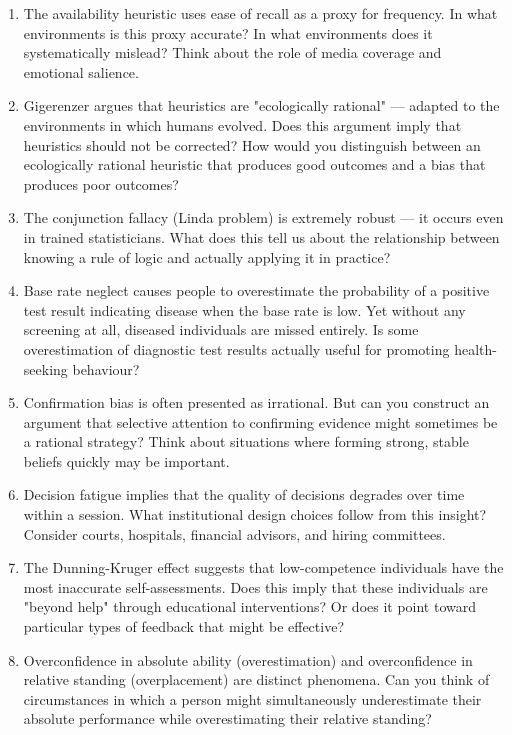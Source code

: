 \documentclass[12pt, letterpaper]{article}
\begin{document}
\begin{enumerate}
\item The availability heuristic uses ease of recall as a proxy for frequency. In what environments is this proxy accurate? In what environments does it systematically mislead? Think about the role of media coverage and emotional salience.

\item Gigerenzer argues that heuristics are "ecologically rational" --- adapted to the environments in which humans evolved. Does this argument imply that heuristics should not be corrected? How would you distinguish between an ecologically rational heuristic that produces good outcomes and a bias that produces poor outcomes?

\item The conjunction fallacy (Linda problem) is extremely robust --- it occurs even in trained statisticians. What does this tell us about the relationship between knowing a rule of logic and actually applying it in practice?

\item Base rate neglect causes people to overestimate the probability of a positive test result indicating disease when the base rate is low. Yet without any screening at all, diseased individuals are missed entirely. Is some overestimation of diagnostic test results actually useful for promoting health-seeking behaviour?

\item Confirmation bias is often presented as irrational. But can you construct an argument that selective attention to confirming evidence might sometimes be a rational strategy? Think about situations where forming strong, stable beliefs quickly may be important.

\item Decision fatigue implies that the quality of decisions degrades over time within a session. What institutional design choices follow from this insight? Consider courts, hospitals, financial advisors, and hiring committees.

\item The Dunning-Kruger effect suggests that low-competence individuals have the most inaccurate self-assessments. Does this imply that these individuals are "beyond help" through educational interventions? Or does it point toward particular types of feedback that might be effective?

\item Overconfidence in absolute ability (overestimation) and overconfidence in relative standing (overplacement) are distinct phenomena. Can you think of circumstances in which a person might simultaneously underestimate their absolute performance while overestimating their relative standing?


\end{enumerate}
\end{document}
